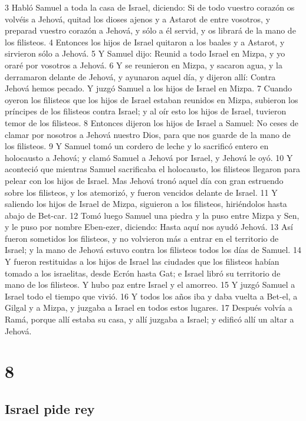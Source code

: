 3 Habló Samuel a toda la casa de Israel, diciendo: Si de todo vuestro corazón os volvéis a Jehová, quitad los dioses ajenos y a Astarot de entre vosotros, y preparad vuestro corazón a Jehová, y sólo a él servid, y os librará de la mano de los filisteos.
4 Entonces los hijos de Israel quitaron a los baales y a Astarot, y sirvieron sólo a Jehová.
5 Y Samuel dijo: Reunid a todo Israel en Mizpa, y yo oraré por vosotros a Jehová.
6 Y se reunieron en Mizpa, y sacaron agua, y la derramaron delante de Jehová, y ayunaron aquel día, y dijeron allí: Contra Jehová hemos pecado. Y juzgó Samuel a los hijos de Israel en Mizpa.
7 Cuando oyeron los filisteos que los hijos de Israel estaban reunidos en Mizpa, subieron los príncipes de los filisteos contra Israel; y al oír esto los hijos de Israel, tuvieron temor de los filisteos.
8 Entonces dijeron los hijos de Israel a Samuel: No ceses de clamar por nosotros a Jehová nuestro Dios, para que nos guarde de la mano de los filisteos.
9 Y Samuel tomó un cordero de leche y lo sacrificó entero en holocausto a Jehová; y clamó Samuel a Jehová por Israel, y Jehová le oyó.
10 Y aconteció que mientras Samuel sacrificaba el holocausto, los filisteos llegaron para pelear con los hijos de Israel. Mas Jehová tronó aquel día con gran estruendo sobre los filisteos, y los atemorizó, y fueron vencidos delante de Israel.
11 Y saliendo los hijos de Israel de Mizpa, siguieron a los filisteos, hiriéndolos hasta abajo de Bet-car.
12 Tomó luego Samuel una piedra y la puso entre Mizpa y Sen, y le puso por nombre Eben-ezer, diciendo: Hasta aquí nos ayudó Jehová. 
13 Así fueron sometidos los filisteos, y no volvieron más a entrar en el territorio de Israel; y la mano de Jehová estuvo contra los filisteos todos los días de Samuel.
14 Y fueron restituidas a los hijos de Israel las ciudades que los filisteos habían tomado a los israelitas, desde Ecrón hasta Gat; e Israel libró su territorio de mano de los filisteos. Y hubo paz entre Israel y el amorreo.
15 Y juzgó Samuel a Israel todo el tiempo que vivió.
16 Y todos los años iba y daba vuelta a Bet-el, a Gilgal y a Mizpa, y juzgaba a Israel en todos estos lugares.
17 Después volvía a Ramá, porque allí estaba su casa, y allí juzgaba a Israel; y edificó allí un altar a Jehová.

\chapter{8}

\section*{Israel pide rey}


